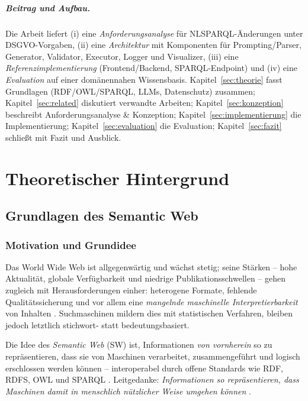 \paragraph{Beitrag und Aufbau.}
Die Arbeit liefert (i) eine \emph{Anforderungsanalyse} für NL{\textrightarrow}SPARQL-Änderungen unter DSGVO-Vorgaben, (ii) eine \emph{Architektur} mit Komponenten für Prompting/Parser, Generator, Validator, Executor, Logger und Visualizer, (iii) eine \emph{Referenzimplementierung} (Frontend/Backend, SPARQL-Endpoint) und (iv) eine \emph{Evaluation} auf einer domänennahen Wissensbasis. Kapitel~\ref{sec:theorie} fasst Grundlagen (RDF/OWL/SPARQL, LLMs, Datenschutz) zusammen; Kapitel~\ref{sec:related} diskutiert verwandte Arbeiten; Kapitel~\ref{sec:konzeption} beschreibt Anforderungsanalyse \& Konzeption; Kapitel~\ref{sec:implementierung} die Implementierung; Kapitel~\ref{sec:evaluation} die Evaluation; Kapitel~\ref{sec:fazit} schließt mit Fazit und Ausblick.





\chapter{Theoretischer Hintergrund}
\label{sec:Theoretischer-Hintergrund}

\section{Grundlagen des Semantic Web}
\label{sec:grundlagen-semantic-web}

\subsection{Motivation und Grundidee}

Das World Wide Web ist allgegenwärtig und wächst stetig; seine Stärken -- hohe Aktualität, globale Verfügbarkeit und niedrige Publikationsschwellen -- gehen zugleich mit Herausforderungen einher: heterogene Formate, fehlende Qualitätssicherung und vor allem eine \emph{mangelnde maschinelle Interpretierbarkeit} von Inhalten \cite{Hitzler}. Suchmaschinen mildern dies mit statistischen Verfahren, bleiben jedoch letztlich stichwort- statt bedeutungsbasiert. 

Die Idee des \emph{Semantic Web} (SW) ist, Informationen \emph{von vornherein} so zu repräsentieren, dass sie von Maschinen verarbeitet, zusammengeführt und logisch erschlossen werden können -- interoperabel durch offene Standards wie RDF, RDFS, OWL und SPARQL \cite{Hitzler,AntoniouVanHarmelen}. Leitgedanke: \emph{Informationen so repräsentieren, dass Maschinen damit in menschlich nützlicher Weise umgehen können} \cite{Hitzler}.

